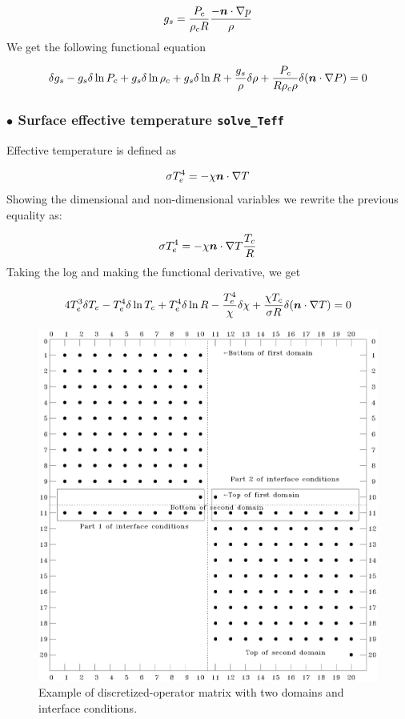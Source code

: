 \[ g_s=\frac{P_c}{\rho_cR}\frac{-\vn\cdot\nabla p}{\rho}\]
We get the following functional equation

\begin{equation}
\delta g_s -g_s\delta\ln P_c +g_s\delta\ln\rho_c+g_s\delta\ln R + \frac{g_s}{\rho}\delta\rho+
\frac{P_c}{R\rho_c\rho}\delta(\vn\cdot\nabla P) = 0
\end{equation}

\subsubsection{$\bullet$ \bf Surface effective temperature {\tt solve\_Teff}}

Effective temperature is defined as

\[ \sigma T_e^4 = -\khi\vn\cdot\na T\]
Showing the dimensional and non-dimensional variables we rewrite the previous equality as:

\[ \sigma T_e^4 = -\khi\vn\cdot\na T \frac{T_c}{R}\]
Taking the log and making the functional derivative, we get

\begin{equation}
4T_e^3\delta T_e -T_e^4\delta\ln T_c + T_e^4\delta\ln R -\frac{T_e^4}{\khi}\delta\khi + \frac{\khi T_c}{\sigma
R}\delta(\vn\cdot\nabla T) = 0
\end{equation}

\begin{figure}[t]
\centering
\includegraphics[width=0.8\linewidth]{fig/matrix_pedago.eps}
\caption{Example of discretized-operator matrix with two domains and
interface conditions.}
\label{matp}
\end{figure}

